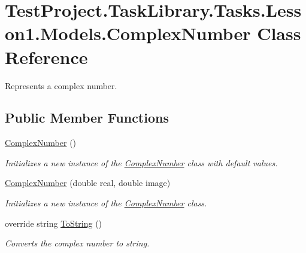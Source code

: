 \hypertarget{class_test_project_1_1_task_library_1_1_tasks_1_1_lesson1_1_1_models_1_1_complex_number}{}\section{Test\+Project.\+Task\+Library.\+Tasks.\+Lesson1.\+Models.\+Complex\+Number Class Reference}
\label{class_test_project_1_1_task_library_1_1_tasks_1_1_lesson1_1_1_models_1_1_complex_number}


Represents a complex number.  


\subsection*{Public Member Functions}
\begin{DoxyCompactItemize}
\item 
\mbox{\hyperlink{class_test_project_1_1_task_library_1_1_tasks_1_1_lesson1_1_1_models_1_1_complex_number_aceab601b09b1ab86a2b1fef68ccb1395}{Complex\+Number}} ()
\begin{DoxyCompactList}\small\item\em Initializes a new instance of the \mbox{\hyperlink{class_test_project_1_1_task_library_1_1_tasks_1_1_lesson1_1_1_models_1_1_complex_number}{Complex\+Number}} class with default values. \end{DoxyCompactList}\item 
\mbox{\hyperlink{class_test_project_1_1_task_library_1_1_tasks_1_1_lesson1_1_1_models_1_1_complex_number_a875b00a5bbddf7b09e9b69ab24baa506}{Complex\+Number}} (double real, double image)
\begin{DoxyCompactList}\small\item\em Initializes a new instance of the \mbox{\hyperlink{class_test_project_1_1_task_library_1_1_tasks_1_1_lesson1_1_1_models_1_1_complex_number}{Complex\+Number}} class. \end{DoxyCompactList}\item 
override string \mbox{\hyperlink{class_test_project_1_1_task_library_1_1_tasks_1_1_lesson1_1_1_models_1_1_complex_number_ae8bd421b10f98e78aa71000ba30b0ea6}{To\+String}} ()
\begin{DoxyCompactList}\small\item\em Converts the complex number to string. \end{DoxyCompactList}\end{DoxyCompactItemize}
